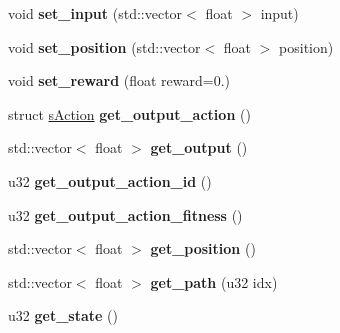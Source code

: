 \begin{DoxyCompactItemize}
\item 
\hypertarget{classCRobot_a351391fb936aee03386e86af1b023066}{void {\bfseries set\-\_\-input} (std\-::vector$<$ float $>$ input)}\label{classCRobot_a351391fb936aee03386e86af1b023066}

\item 
\hypertarget{classCRobot_a1857f6841d16ba10bf1cf4844c19598e}{void {\bfseries set\-\_\-position} (std\-::vector$<$ float $>$ position)}\label{classCRobot_a1857f6841d16ba10bf1cf4844c19598e}

\item 
\hypertarget{classCRobot_a38a3f39e4c38020623953e53444db628}{void {\bfseries set\-\_\-reward} (float reward=0.)}\label{classCRobot_a38a3f39e4c38020623953e53444db628}

\item 
\hypertarget{classCRobot_a21f7af13120907f47c4e5665e91a576e}{struct \hyperlink{structsAction}{s\-Action} {\bfseries get\-\_\-output\-\_\-action} ()}\label{classCRobot_a21f7af13120907f47c4e5665e91a576e}

\item 
\hypertarget{classCRobot_aefbdde13aa4ace258570cad6403d4f94}{std\-::vector$<$ float $>$ {\bfseries get\-\_\-output} ()}\label{classCRobot_aefbdde13aa4ace258570cad6403d4f94}

\item 
\hypertarget{classCRobot_a6b956550ea12140668160b0b579ee9c9}{u32 {\bfseries get\-\_\-output\-\_\-action\-\_\-id} ()}\label{classCRobot_a6b956550ea12140668160b0b579ee9c9}

\item 
\hypertarget{classCRobot_a567c257d3b1253d26bc5172c6c0ceae7}{u32 {\bfseries get\-\_\-output\-\_\-action\-\_\-fitness} ()}\label{classCRobot_a567c257d3b1253d26bc5172c6c0ceae7}

\item 
\hypertarget{classCRobot_a9c685d525696364ab95075071d3fce25}{std\-::vector$<$ float $>$ {\bfseries get\-\_\-position} ()}\label{classCRobot_a9c685d525696364ab95075071d3fce25}

\item 
\hypertarget{classCRobot_a4bcb1bb8178861f4fb50085c0e1db6a5}{std\-::vector$<$ float $>$ {\bfseries get\-\_\-path} (u32 idx)}\label{classCRobot_a4bcb1bb8178861f4fb50085c0e1db6a5}

\item 
\hypertarget{classCRobot_ab3138c98ec513c8ba8b62ca256dc218b}{u32 {\bfseries get\-\_\-state} ()}\label{classCRobot_ab3138c98ec513c8ba8b62ca256dc218b}


\end{DoxyCompactItemize}
